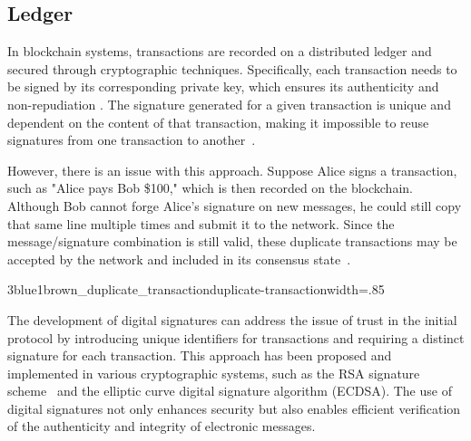 \subsection{Ledger}
In blockchain systems, transactions are recorded on a distributed ledger and secured through cryptographic techniques. Specifically, each
transaction needs to be signed by its corresponding private key, which ensures its authenticity and non-repudiation
\cite{stinson2018cryptography}. The signature generated for a given transaction is unique and dependent on the content of that transaction,
making it impossible to reuse signatures from one transaction to another~\cite{bruce1996applied}.

However, there is an issue with this approach. Suppose Alice signs a transaction, such as "Alice pays Bob \$100," which is then recorded on
the blockchain. Although Bob cannot forge Alice's signature on new messages, he could still copy that same line multiple times and submit it
to the network. Since the message/signature combination is still valid, these duplicate transactions may be accepted by the network and
included in its consensus state~\cite{swan2015blockchain}.

{3blue1brown_duplicate_transaction}{duplicate-transaction}{width=.85\textwidth}%

The development of digital signatures can address the issue of trust in the initial protocol by introducing unique identifiers for transactions
and requiring a distinct signature for each transaction. This approach has been proposed and implemented in various cryptographic systems,
such as the RSA signature scheme~\cite{rivest1978method} and the elliptic curve digital signature algorithm (ECDSA). The use of digital
signatures not only enhances security but also enables efficient verification of the authenticity and integrity of electronic messages.


